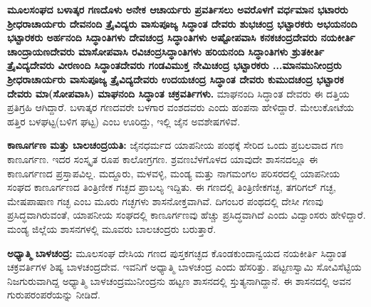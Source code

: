 \textbf{ಮೂಲಸಂಘದ ಬಳಾತ್ಕರ ಗಣದೊಳು ಅನೇಕ ಆಚಾರ್ಯರು ಪ್ರವರ್ತಿಸಲು ಅವರೊಳಗೆ \general{\enginline{-}} ವರ್ಧಮಾನ ಭಟಾರರು \general{\enginline{-}} ಶ‍್ರೀಧರಾಚಾರ್ಯರು \general{\enginline{-}} ದೇವನಂದಿ ತ್ರೈವಿದ್ಯರು \general{\enginline{-}} ವಾಸುಪೂಜ್ಯ ಸಿದ್ಧಾಂತ ದೇವರು \general{\enginline{-}} ಶುಭಚಂದ್ರ ಭಟ್ಟಾರಕರು \general{\enginline{-}} ಅಭಯನಂದಿ ಭಟ್ಟಾರಕರು \general{\enginline{-}} ಅರ್ಹನಂದಿ ಸಿದ್ಧಾಂತಿಗಳು \general{\enginline{-}} ದೇವಚಂದ್ರ ಸಿದ್ಧಾಂತಿಗಳು \general{\enginline{-}} ಅಷ್ಟೋಪವಾಸಿ ಕನಕಚಂದ್ರದೇವರು \general{\enginline{-}} ನಯಕೀರ್ತಿ\general{\break } ಚಾಂದ್ರಾಯಣದೇವರು \general{\enginline{-}} ಮಾಸೋಪವಾಸಿ ರವಿಚಂದ್ರಸಿದ್ಧಾಂತಿಗಳು \general{\enginline{-}} ಹರಿಯನಂದಿ ಸಿದ್ಧಾಂತಿಗಳು \general{\enginline{-}}\general{\break }ಶ್ರುತಕೀರ್ತಿ ತ್ರೈವಿದ್ಯದೇವರು \general{\enginline{-}} ವೀರಣಂದಿ ಸಿದ್ಧಾಂತದೇವರು \general{\enginline{-}} ಗಂಡವಿಮುಕ್ತ ನೇಮಿಚಂದ್ರ ಭಟ್ಟಾರಕರು \general{\enginline{-}}\general{\break }...ಮಾನಮುನೀಂದ್ರರು \general{\enginline{-}} ಶ‍್ರೀಧರಾಚಾರ್ಯರು \general{\enginline{-}} ವಾಸುಪೂಜ್ಯ ತ್ರೈವಿದ್ಯದೇವರು \general{\enginline{-}} ಉದಯಚಂದ್ರ ಸಿದ್ಧಾಂತ\general{\break } ದೇವರು \general{\enginline{-}} ಕುಮುದಚಂದ್ರ ಭಟ್ಟಾರಕ ದೇವರು \general{\enginline{-}} ಮಾ(ಸೋಪವಾಸಿ) ಮಾಘನಂದಿ ಸಿದ್ಧಾಂತ ಚಕ್ರವರ್ತಿಗಳು. }ಮಾಘನಂದಿ ಸಿದ್ಧಾಂತ ದೇವರು ಈ ದತ್ತಿಯ ಪ್ರತಿಗ್ರಹಿ ಆಗಿದ್ದಾರೆ. ಬಳಾತ್ಕರ ಗಣದವರೇ ಬಳಗಾರ ವಂಶದವರು ಎಂದು ಹಂಪನಾ ಹೇಳಿದ್ದಾರೆ. ಮೇಲುಕೋಟೆಯ ಹತ್ತಿರ ಬಳಘಟ್ಟ(ಬಳಿಗ ಘಟ್ಟ) ಎಂಬ ಊರಿದ್ದು, ಇಲ್ಲಿ ಜೈನ ಅವಶೇಷಗಳಿವೆ.

\vskip 3pt

\textbf{ಕಾಣೂರ್ಗಣ ಮತ್ತು ಬಾಲಚಂದ್ರಯತಿ:} ಜೈನಧರ್ಮದ ಯಾಪನೀಯ ಪಂಥಕ್ಕೆ ಸೇರಿದ ಒಂದು ಪ್ರಬಲವಾದ ಗಣ ಕಾಣೂರ್ಗಣ. ಇದರ ಸಂಸ್ಕೃತ ರೂಪ ಕಾಲೋಗ್ರಗಣ. ಶ್ರವಣಬೆಳಗೊಳದ ಯಾವುದೇ ಶಾಸನದಲ್ಲೂ ಈ ಕಾಣೂರ್ಗಣದ ಪ್ರಸ್ತಾಪವಿಲ್ಲ. ಮದ್ದೂರು, ಮಳವಳ್ಳಿ, ಮಂಡ್ಯ ಮತ್ತು ನಾಗಮಂಗಲ ಪರಿಸರದಲ್ಲಿ ಯಾಪನೀಯ ಸಂಘದ ಕಾಣೂರ್ಗಣದ ತಿಂತ್ರಿಣೀಕ ಗಚ್ಛದ ಪ್ರಾಬಲ್ಯ ಇದ್ದಿತು. ಈ ಗಣದಲ್ಲಿ ತಿಂತ್ರಿಣೀಕಗಚ್ಛ, ತಗರಿಗಲ್​ ಗಚ್ಛ, ಮೇಷಪಾಷಾಣ ಗಚ್ಛ ಎಂಬ ಮೂರು ಗಚ್ಛಗಳು ಶಾಸನೋಕ್ತವಾಗಿವೆ. ದಿಗಂಬರ ಪಂಥದಲ್ಲಿ ದೇಸೀ ಗಣವು ಪ್ರಸಿದ್ಧವಾಗಿರುವಂತೆ, ಯಾಪನೀಯ ಸಂಘದಲ್ಲಿ ಕಾಣೂರ್ಗಣವು ಹೆಚ್ಚು ಪ್ರಸಿದ್ಧವಾಗಿದೆ ಎಂದು ವಿದ್ವಾಂಸರು ಹೇಳಿದ್ದಾರೆ. ಮಂಡ್ಯ ಜಿಲ್ಲೆಯ ಶಾಸನಗಳಲ್ಲಿ ಮೂವರು ಬಾಲಚಂದ್ರರು ಬರುತ್ತಾರೆ.

\textbf{ಅಧ್ಯಾತ್ಮಿ ಬಾಳಚಂದ್ರ:} ಮೂಲಸಂಘ ದೇಸಿಯ ಗಣದ ಪುಸ್ತಕಗಚ್ಛದ ಕೊಂಡಕುಂದಾನ್ವಯದ ನಯಕೀರ್ತಿ ಸಿದ್ಧಾಂತ ಚಕ್ರವರ್ತಿಗಳ ಶಿಷ್ಯ ಬಾಳಚಂದ್ರದೇವ. ಇವನಿಗೆ ಅಧ್ಯಾತ್ಮಿ ಬಾಳಚಂದ್ರ ಎಂದು ಹೆಸರಿತ್ತು. ಪಟ್ಟಣಸ್ವಾಮಿ ಸೋವಿಸೆಟ್ಟಿಯ ನಿಜಗುರುವಾಗಿದ್ದ ಅಧ್ಯಾತ್ಮಿ ಬಾಳಚಂದ್ರಮುನೀಂದ್ರನು ಹಟ್ಟಣ ಶಾಸನದಲ್ಲಿ ಸ್ತುತ್ಯನಾಗಿದ್ದಾನೆ. ಈ ಶಾಸನದಲ್ಲಿ ಅವನ ಗುರುಪರಂಪರೆಯನ್ನು ನೀಡಿದೆ.

